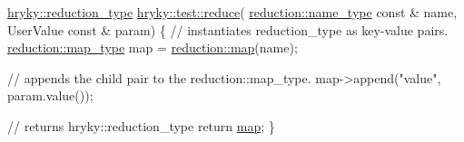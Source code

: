 \begin{DoxyCodeInclude}
\hyperlink{classhryky_1_1_intrusive_ptr}{hryky::reduction_type} \hyperlink{namespacehryky_af41cb3af6766761da0ff21b84527a52c}{hryky::test::reduce}(
    \hyperlink{namespacehryky_1_1reduction_ac686c30a4c8d196bbd0f05629a6b921f}{reduction::name_type} \textcolor{keyword}{const} & name, UserValue \textcolor{keyword}{const} & param) \{
    \textcolor{comment}{// instantiates reduction\_type as key-value pairs.}
    \hyperlink{namespacehryky_1_1reduction_a64228de3f2cff9ed9d5ad836a120c7f7}{reduction::map_type} map = \hyperlink{namespacehryky_1_1reduction_ac5eae270cf8047b294dc4ff3e5e11a79}{reduction::map}(name);

    \textcolor{comment}{// appends the child pair to the reduction::map\_type.}
    map->append(\textcolor{stringliteral}{"value"}, param.value());

    \textcolor{comment}{// returns hryky::reduction\_type}
    \textcolor{keywordflow}{return} \hyperlink{namespacehryky_1_1reduction_ac5eae270cf8047b294dc4ff3e5e11a79}{map};
\}

\end{DoxyCodeInclude}
 